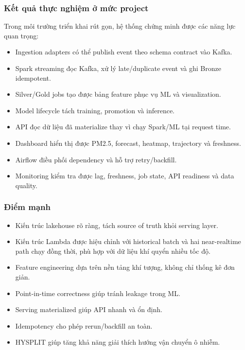 \documentclass[12pt,a4paper]{article}
\newcommand{\tightlist}{\setlength{\itemsep}{0pt}\setlength{\parskip}{0pt}}
\begin{document}
\subsubsection{Kết quả thực nghiệm ở mức project}\label{kux1ebft-quux1ea3-thux1ef1c-nghiux1ec7m-ux1edf-mux1ee9c-project}

Trong môi trường triển khai rút gọn, hệ thống chứng minh được các năng lực quan trọng:

\begin{itemize}
\tightlist
\item
  Ingestion adapters có thể publish event theo schema contract vào Kafka.
\item
  Spark streaming đọc Kafka, xử lý late/duplicate event và ghi Bronze idempotent.
\item
  Silver/Gold jobs tạo được bảng feature phục vụ ML và visualization.
\item
  Model lifecycle tách training, promotion và inference.
\item
  API đọc dữ liệu đã materialize thay vì chạy Spark/ML tại request time.
\item
  Dashboard hiển thị được PM2.5, forecast, heatmap, trajectory và freshness.
\item
  Airflow điều phối dependency và hỗ trợ retry/backfill.
\item
  Monitoring kiểm tra được lag, freshness, job state, API readiness và data quality.
\end{itemize}

\subsubsection{Điểm mạnh}\label{ux111iux1ec3m-mux1ea1nh}

\begin{itemize}
\tightlist
\item
  Kiến trúc lakehouse rõ ràng, tách source of truth khỏi serving layer.
\item
  Kiến trúc Lambda được hiệu chỉnh với historical batch và hai near-realtime path chạy đồng thời, phù hợp với dữ liệu khí quyển nhiều tốc độ.
\item
  Feature engineering dựa trên nền tảng khí tượng, không chỉ thống kê đơn giản.
\item
  Point-in-time correctness giúp tránh leakage trong ML.
\item
  Serving materialized giúp API nhanh và ổn định.
\item
  Idempotency cho phép rerun/backfill an toàn.
\item
  HYSPLIT giúp tăng khả năng giải thích hướng vận chuyển ô nhiễm.
\end{itemize}
\end{document}
